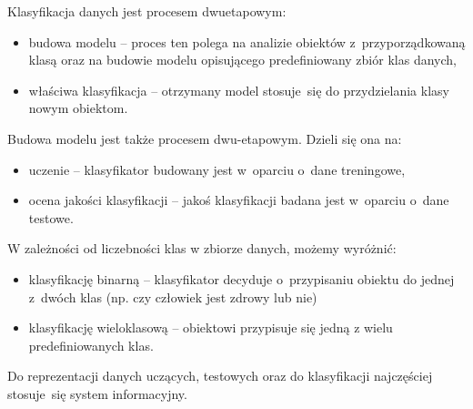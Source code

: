 Klasyfikacja danych jest procesem dwuetapowym:
\begin{itemize}
	\item budowa modelu – proces ten polega na analizie obiektów z przyporządkowaną klasą oraz na budowie modelu opisującego predefiniowany zbiór klas danych,
	\item właściwa klasyfikacja – otrzymany model stosuje się do przydzielania klasy nowym obiektom.
\end{itemize}
Budowa modelu jest także procesem dwu-etapowym. Dzieli się ona na:
\begin{itemize}
	\item uczenie – klasyfikator budowany jest w oparciu o dane treningowe,
	\item ocena jakości klasyfikacji – jakoś klasyfikacji badana jest w oparciu o dane testowe.
\end{itemize}
W zależności od liczebności klas w zbiorze danych, możemy wyróżnić:
\begin{itemize}
	\item klasyfikację binarną – klasyfikator decyduje o przypisaniu obiektu do jednej z dwóch klas (np. czy człowiek jest zdrowy lub nie)
	\item klasyfikację wieloklasową – obiektowi przypisuje się jedną z wielu predefiniowanych klas.
\end{itemize}
Do reprezentacji danych uczących, testowych oraz do klasyfikacji najczęściej stosuje się system informacyjny.
\begin{table}[h]
\begin{center}
	\caption{Przykład danych treningowych składających się z 5 atrybutów oraz klasy decyzyjnej. W ostatniej kolumnie znajduje się wynik klasyfikacji. W pięciu przypadkach, klasyfikator poprawnie wskazał klasę.}
	\label{system_informacyjny}
\end{center}
\end{table}


